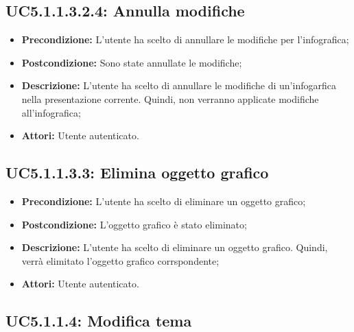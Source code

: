 \subsection{ UC5.1.1.3.2.4: Annulla modifiche}

\begin{itemize}
	\item \textbf{Precondizione:} L'utente ha scelto di annullare le modifiche per l'infografica;
	\item \textbf{Postcondizione:} Sono state annullate le modifiche;
	\item \textbf{Descrizione:} L'utente ha scelto di annullare le modifiche di un'infogarfica nella presentazione corrente. Quindi, non verranno applicate modifiche all'infografica;
	\item \textbf{Attori:} Utente autenticato.
\end{itemize}
\subsection{ UC5.1.1.3.3: Elimina oggetto grafico}

\begin{itemize}
	\item \textbf{Precondizione:} L'utente ha scelto di eliminare un oggetto grafico;
	\item \textbf{Postcondizione:} L'oggetto grafico è stato eliminato;
	\item \textbf{Descrizione:} L'utente ha scelto di eliminare un oggetto grafico. Quindi, verrà elimitato l'oggetto grafico corrspondente;
	\item \textbf{Attori:} Utente autenticato.
\end{itemize}
\subsection{ UC5.1.1.4: Modifica tema}

